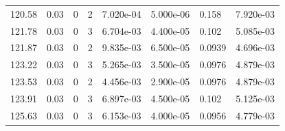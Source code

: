 \documentclass[preview]{standalone}
\begin{document}
{{{\begin{tabular}{L{1.2cm}C{1.2cm} C{0.3cm}C{0.5cm} C{1.4cm}C{1.4cm} C{1.4cm}C{1.4cm}}
  120.58  &  0.03  & 0     &  2 &  7.020e-04  & 5.000e-06  & 0.158 &  7.920e-03   \\ 
  121.78  &  0.03  & 0     &  3 &  6.704e-03  & 4.400e-05  & 0.102 &  5.085e-03   \\ 
  121.87  &  0.03  & 0     &  2 &  9.835e-03  & 6.500e-05  & 0.0939 &  4.696e-03   \\ 
  123.22  &  0.03  & 0     &  3 &  5.265e-03  & 3.500e-05  & 0.0976 &  4.879e-03   \\ 
  123.53  &  0.03  & 0     &  2 &  4.456e-03  & 2.900e-05  & 0.0976 &  4.879e-03   \\ 
  123.91  &  0.03  & 0     &  3 &  6.897e-03  & 4.500e-05  & 0.102 &  5.125e-03   \\ 
  125.63  &  0.03  & 0     &  3 &  6.153e-03  & 4.000e-05  & 0.0956 &  4.779e-03   \\ 
\hline 
\end{tabular} 

}}}
\end{document}
